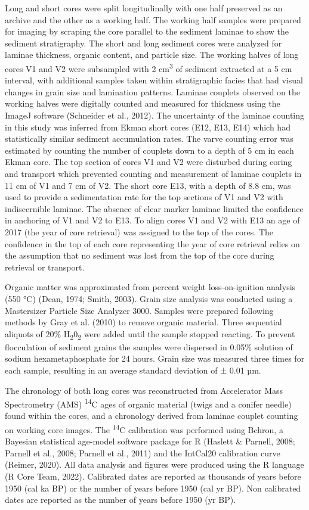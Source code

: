 \documentclass[
  letterpaper,
  DIV=11,
  numbers=noendperiod]{scrartcl}
\begin{document}
Long and short cores were split longitudinally with one half preserved
as an archive and the other as a working half. The working half samples
were prepared for imaging by scraping the core parallel to the sediment
laminae to show the sediment stratigraphy. The short and long sediment
cores were analyzed for laminae thickness, organic content, and particle
size. The working halves of long cores V1 and V2 were subsampled with 2
cm\textsuperscript{3} of sediment extracted at a 5 cm interval, with
additional samples taken within stratigraphic facies that had visual
changes in grain size and lamination patterns. Laminae couplets observed
on the working halves were digitally counted and measured for thickness
using the ImageJ software (Schneider et al., 2012). The uncertainty of
the laminae counting in this study was inferred from Ekman short cores
(E12, E13, E14) which had statistically similar sediment accumulation
rates. The varve counting error was estimated by counting the number of
couplets down to a depth of 5 cm in each Ekman core. The top section of
cores V1 and V2 were disturbed during coring and transport which
prevented counting and measurement of laminae couplets in 11 cm of V1
and 7 cm of V2. The short core E13, with a depth of 8.8 cm, was used to
provide a sedimentation rate for the top sections of V1 and V2 with
indiscernible laminae. The absence of clear marker laminae limited the
confidence in anchoring of V1 and V2 to E13. To align cores V1 and V2
with E13 an age of 2017 (the year of core retrieval) was assigned to the
top of the cores. The confidence in the top of each core representing
the year of core retrieval relies on the assumption that no sediment was
lost from the top of the core during retrieval or transport.

Organic matter was approximated from percent weight loss-on-ignition
analysis (550 °C) (Dean, 1974; Smith, 2003). Grain size analysis was
conducted using a Mastersizer Particle Size Analyzer 3000. Samples were
prepared following methods by Gray et al. (2010) to remove organic
material. Three sequential aliquots of 20\%
H\textsubscript{2}0\textsubscript{2} were added until the sample stopped
reacting. To prevent flocculation of sediment grains the samples were
dispersed in 0.05\% solution of sodium hexametaphosphate for 24 hours.
Grain size was measured three times for each sample, resulting in an
average standard deviation of ± 0.01 µm.

The chronology of both long cores was reconstructed from Accelerator
Mass Spectrometry (AMS) \textsuperscript{14}C ages of organic material
(twigs and a conifer needle) found within the cores, and a chronology
derived from laminae couplet counting on working core images. The
\textsuperscript{14}C calibration was performed using Bchron, a Bayesian
statistical age-model software package for R (Haslett \& Parnell, 2008;
Parnell et al., 2008; Parnell et al., 2011) and the IntCal20 calibration
curve (Reimer, 2020). All data analysis and figures were produced using
the R language (R Core Team, 2022). Calibrated dates are reported as
thousands of years before 1950 (cal ka BP) or the number of years before
1950 (cal yr BP). Non calibrated dates are reported as the number of
years before 1950 (yr BP).
\end{document}
